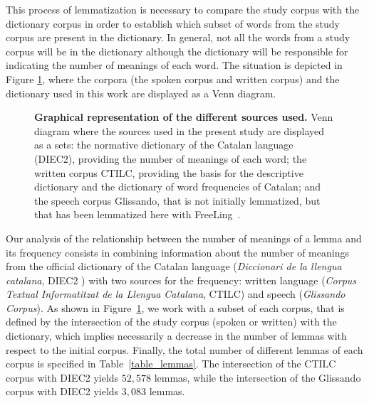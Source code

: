 \documentclass[10pt,letterpaper]{article}
\newif\ifarxiv
\begin{document}
This process of lemmatization is necessary to compare the study corpus with the dictionary corpus in order to establish which subset of words from the study corpus are present in the dictionary. In general, not all the words from a study corpus will be in the dictionary although the dictionary will be responsible for indicating the number of meanings of each word. The situation is depicted in Figure \ref{fig1}, where the corpora (the spoken corpus and written corpus) and the dictionary used in this work are displayed as a Venn diagram.

\begin{figure}[!h]
\ifarxiv
\begin{center}
\centering\texttt{[image: New\_Venn\_diagram]}
\end{center}
\fi
\caption{\textbf{Graphical representation of the different sources used.} Venn diagram where the sources used in the present study are displayed as a sets: the normative dictionary of the Catalan language (DIEC2), providing  the number of meanings of each word; the written corpus CTILC, providing the basis for the descriptive dictionary and the dictionary of word frequencies of Catalan; and the speech corpus Glissando, that is not initially lemmatized, but that has been lemmatized here with FreeLing~\cite{Padro2012}.}
\label{fig1}
\end{figure}

Our analysis of the relationship between the number of meanings of a lemma and its frequency consists in combining information about the number of meanings from the official dictionary of the Catalan language (\textit{Diccionari de la llengua catalana}, DIEC2 \cite{DIEC2}) with two sources for the frequency: written language (\textit{Corpus Textual Informatitzat de la Llengua Catalana}, CTILC) and speech (\textit{Glissando Corpus}). As shown  in Figure~\ref{fig1}, we work with a subset of each corpus, that is defined by the intersection of the study corpus (spoken or written) with the dictionary, which implies necessarily a decrease in the number of lemmas with respect to the initial corpus.
Finally, the total number of different lemmas of each corpus is specified in Table~\ref{table_lemmas}. The intersection of the CTILC corpus with DIEC2 yields $52,578$ lemmas, while the intersection of the Glissando corpus with DIEC2 yields $3,083$ lemmas.\\
\end{document}
